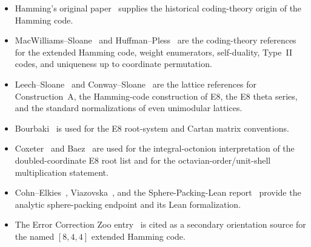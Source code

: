 \documentclass[12pt]{article}
\theoremstyle{definition}
\begin{document}
\begin{itemize}
\item Hamming's original paper~\cite{Hamming1950} supplies the historical
      coding-theory origin of the Hamming code.
\item MacWilliams--Sloane~\cite{MacSloane1977} and
      Huffman--Pless~\cite{HuffmanPless2003} are the coding-theory references
      for the extended Hamming code, weight enumerators, self-duality, Type~II
      codes, and uniqueness up to coordinate permutation.
\item Leech--Sloane~\cite{LeechSloane1971} and
      Conway--Sloane~\cite{ConwaySloane1999} are the lattice references for
      Construction~A, the Hamming-code construction of E8, the E8 theta series,
      and the standard normalizations of even unimodular lattices.
\item Bourbaki~\cite{Bourbaki2002} is used for the E8 root-system and Cartan
      matrix conventions.
\item Coxeter~\cite{Coxeter1946} and Baez~\cite{Baez2002} are used for the
      integral-octonion interpretation of the doubled-coordinate E8 root list
      and for the octavian-order/unit-shell multiplication statement.
\item Cohn--Elkies~\cite{CohnElkies2003}, Viazovska~\cite{Viazovska2017}, and
      the Sphere-Packing-Lean report~\cite{SPL2025} provide the analytic
      sphere-packing endpoint and its Lean formalization.
\item The Error Correction Zoo entry~\cite{ECZ} is cited as a secondary
      orientation source for the named $[8,4,4]$ extended Hamming code.
\end{itemize}
\end{document}
